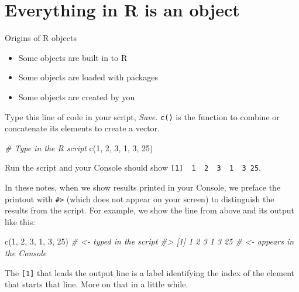 \documentclass[
]{book}
\newenvironment{Shaded}{\begin{snugshade}}{\end{snugshade}}
\newcommand{\CommentTok}[1]{\textcolor[rgb]{0.56,0.35,0.01}{\textit{#1}}}
\newcommand{\DecValTok}[1]{\textcolor[rgb]{0.00,0.00,0.81}{#1}}
\newcommand{\FunctionTok}[1]{\textcolor[rgb]{0.00,0.00,0.00}{#1}}
\newcommand{\NormalTok}[1]{#1}
\providecommand{\tightlist}{%
  \setlength{\itemsep}{0pt}\setlength{\parskip}{0pt}}
\begin{document}
\hypertarget{everything-in-r-is-an-object}{%
\section{Everything in R is an object}\label{everything-in-r-is-an-object}}

Origins of R objects

\begin{itemize}
\tightlist
\item
  Some objects are built in to R
\item
  Some objects are loaded with packages
\item
  Some objects are created by you
\end{itemize}

Type this line of code in your script, \emph{Save.} \texttt{c()} is the function to combine or concatenate its elements to create a vector.

\begin{Shaded}
\begin{Highlighting}[]
\CommentTok{\# Type in the R script}
\FunctionTok{c}\NormalTok{(}\DecValTok{1}\NormalTok{, }\DecValTok{2}\NormalTok{, }\DecValTok{3}\NormalTok{, }\DecValTok{1}\NormalTok{, }\DecValTok{3}\NormalTok{, }\DecValTok{25}\NormalTok{)}
\end{Highlighting}
\end{Shaded}

Run the script and your Console should show \texttt{{[}1{]}\ \ 1\ \ 2\ \ 3\ \ 1\ \ 3\ 25}.

In these notes, when we show results printed in your Console, we preface the printout with \texttt{\#\textgreater{}} (which does not appear on your screen) to distinguish the results from the script. For example, we show the line from above and its output like this:

\begin{Shaded}
\begin{Highlighting}[]
\FunctionTok{c}\NormalTok{(}\DecValTok{1}\NormalTok{, }\DecValTok{2}\NormalTok{, }\DecValTok{3}\NormalTok{, }\DecValTok{1}\NormalTok{, }\DecValTok{3}\NormalTok{, }\DecValTok{25}\NormalTok{)          }\CommentTok{\# \textless{}{-} typed in the script}
\CommentTok{\#\textgreater{} [1]  1  2  3  1  3 25      \# \textless{}{-} appears in the Console}
\end{Highlighting}
\end{Shaded}

The \texttt{{[}1{]}} that leads the output line is a label identifying the index of the element that starts that line. More on that in a little while.
\end{document}
